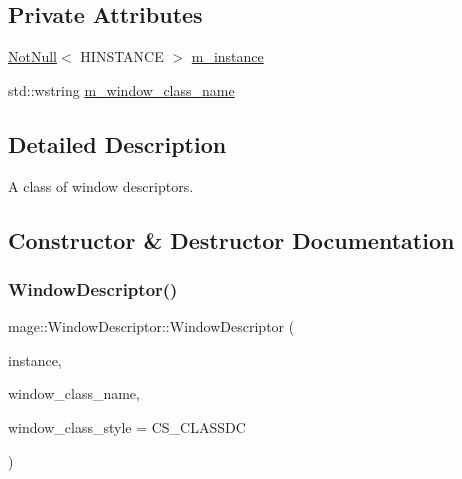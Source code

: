 \subsection*{Private Attributes}
\begin{DoxyCompactItemize}
\item 
\mbox{\hyperlink{namespacemage_a8769f9d670d6b585ea306cb1062af94b}{Not\+Null}}$<$ H\+I\+N\+S\+T\+A\+N\+CE $>$ \mbox{\hyperlink{classmage_1_1_window_descriptor_afa7ab62493d51db5d1ab6a4167f2da4a}{m\+\_\+instance}}
\item 
std\+::wstring \mbox{\hyperlink{classmage_1_1_window_descriptor_a773ae3d93c90d65690f18d79945530ed}{m\+\_\+window\+\_\+class\+\_\+name}}
\end{DoxyCompactItemize}


\subsection{Detailed Description}
A class of window descriptors. 

\subsection{Constructor \& Destructor Documentation}
\mbox{\label{classmage_1_1_window_descriptor_a3c0f82aaea1ac634e0001e2bdf1484ab}} 
\subsubsection{\texorpdfstring{Window\+Descriptor()}{WindowDescriptor()}\hspace{0.1cm}{\footnotesize\ttfamily [1/3]}}
{\footnotesize\ttfamily mage\+::\+Window\+Descriptor\+::\+Window\+Descriptor (\begin{DoxyParamCaption}\item[{\mbox{\hyperlink{namespacemage_a8769f9d670d6b585ea306cb1062af94b}{Not\+Null}}$<$ H\+I\+N\+S\+T\+A\+N\+CE $>$}]{instance,  }\item[{std\+::wstring}]{window\+\_\+class\+\_\+name,  }\item[{\mbox{\hyperlink{namespacemage_aa5d6eaabaac3cdd01873d6a3d27e90f3}{U32}}}]{window\+\_\+class\+\_\+style = {\ttfamily CS\+\_\+CLASSDC} }\end{DoxyParamCaption})\hspace{0.3cm}{\ttfamily [explicit]}}


